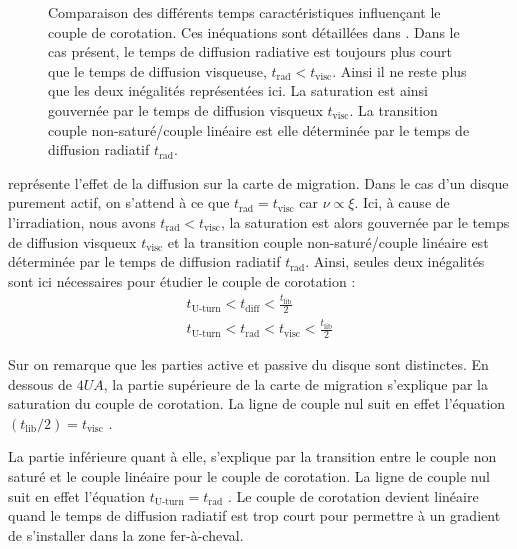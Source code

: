\begin{figure}[htbp]
\centering
{}\hfill
{}

\caption{Comparaison des différents temps caractéristiques influençant le couple de corotation. Ces inéquations sont détaillées
dans . Dans le cas présent, le temps de diffusion radiative est toujours plus court que le temps
de diffusion visqueuse, $t_\text{rad}<t_\text{visc}$. Ainsi il ne reste plus que les deux inégalités représentées
ici. La saturation est ainsi gouvernée par le temps de diffusion visqueux $t_\text{visc}$. La transition couple non-saturé/couple linéaire est elle déterminée par le temps de diffusion radiatif $t_\text{rad}$.}\label{fig:timescales_maps}
\end{figure}

 représente l'effet de la diffusion sur la carte de migration. Dans le cas d'un disque purement actif, on s'attend à ce que $t_\text{rad}=t_\text{visc}$ car $\nu\propto\xi$. Ici, à cause de l'irradiation, nous avons $t_\text{rad}<t_\text{visc}$, la saturation est alors gouvernée par le temps de diffusion visqueux $t_\text{visc}$ et la transition couple non-saturé/couple linéaire est déterminée par le temps de diffusion radiatif $t_\text{rad}$. Ainsi, seules deux inégalités sont ici nécessaires pour étudier le couple de corotation :
\begin{align}
t_\text{U-turn} < t_\text{diff} < \frac{t_\text{lib}}{2}\\\nonumber
t_\text{U-turn} < t_\text{rad} < t_\text{visc} < \frac{t_\text{lib}}{2}
\end{align}

Sur  on remarque que les parties active et passive du disque sont distinctes. En dessous de $4\unit{UA}$, la partie supérieure de la carte de migration s'explique par la saturation du couple de corotation. La ligne de couple nul suit en effet l'équation $(t_\text{lib}/2) = t_\text{visc}$ .

La partie inférieure quant à elle, s'explique par la transition entre le couple non saturé et le couple linéaire pour le couple de corotation. La ligne de couple nul suit en effet l'équation $t_\text{U-turn} = t_\text{rad}$ . Le couple de corotation devient linéaire quand le temps de diffusion radiatif est trop court pour permettre à un gradient de s'installer dans la zone fer-à-cheval.

